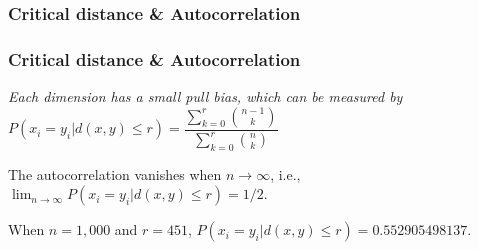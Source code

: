 \documentclass{beamer}
\begin{document}
\begin{frame}
\frametitle{Critical distance \& Autocorrelation}
\begin{figure}
\end{figure}
\end{frame}


\begin{frame}
\frametitle{Critical distance \& Autocorrelation}
\begin{theorem}
\emph{Each dimension has a small pull bias, which can be measured by}
$P(x_i = y_i | d(x, y) \le r) = \dfrac{\sum_{k=0}^{r} \binom{n-1}{k}}{\sum_{k=0}^{r} \binom{n}{k}}$
\end{theorem}

\begin{theorem}
The autocorrelation vanishes when $n \rightarrow \infty$, i.e., $\lim_{n \rightarrow \infty} P(x_i = y_i | d(x, y) \le r) = 1/2$.
\end{theorem}

When $n=1,000$ and $r=451$, $P(x_i = y_i | d(x, y) \le r) = 0.552905498137$.
\end{frame}
\end{document}
